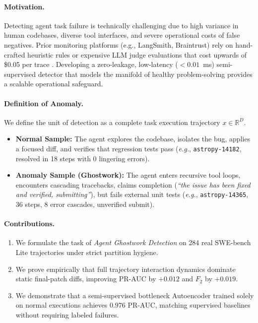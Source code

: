 \documentclass[11pt]{article}
\begin{document}
\paragraph{Motivation.}
Detecting agent task failure is technically challenging due to high variance in human codebases, diverse tool interfaces, and severe operational costs of false negatives. Prior monitoring platforms (e.g., LangSmith, Braintrust) rely on hand-crafted heuristic rules or expensive LLM judge evaluations that cost upwards of \$0.05 per trace \citep{galea2026atfd}. Developing a zero-leakage, low-latency ($<0.01$~ms) semi-supervised detector that models the manifold of healthy problem-solving provides a scalable operational safeguard.

\paragraph{Definition of Anomaly.}
We define the unit of detection as a complete task execution trajectory $x \in \mathbb{R}^D$.
\begin{itemize}
    \item \textbf{Normal Sample:} The agent explores the codebase, isolates the bug, applies a focused diff, and verifies that regression tests pass (\textit{e.g.}, \texttt{astropy-14182}, resolved in 18 steps with 0 lingering errors).
    \item \textbf{Anomaly Sample (Ghostwork):} The agent enters recursive tool loops, encounters cascading tracebacks, claims completion (\textit{``the issue has been fixed and verified, submitting''}), but fails external unit tests (\textit{e.g.}, \texttt{astropy-14365}, 36 steps, 8 error cascades, unverified submit).
\end{itemize}

\paragraph{Contributions.}
\begin{enumerate}
    \item We formulate the task of \textit{Agent Ghostwork Detection} on 284 real SWE-bench Lite trajectories under strict partition hygiene.
    \item We prove empirically that full trajectory interaction dynamics dominate static final-patch diffs, improving PR-AUC by $+0.012$ and $F_2$ by $+0.019$.
    \item We demonstrate that a semi-supervised bottleneck Autoencoder trained solely on normal executions achieves $0.976$ PR-AUC, matching supervised baselines without requiring labeled failures.
\end{enumerate}
\end{document}
